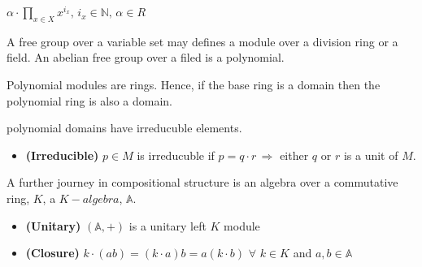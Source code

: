 \documentclass[aps,twocolumn,secnumarabic,nobalancelastpage,amsmath,amssymb,
amsthm,nofootinbib,parskip=full]{revtex4}
\begin{document}
\begin{center}
$\alpha\cdot\prod_{x\in X}x^{i_x},\,i_x\in\mathbb{N},\,\alpha\in R$
\end{center}

A free group over a variable set may defines a module over
a division ring or a field. An abelian free group over a filed
is a polynomial.

Polynomial modules are rings. Hence, if the base ring is a domain
then the polynomial ring is also a domain.

polynomial domains have irreducuble elements.

\begin{itemize}
\item \textbf{\small (Irreducible)} $p\in M$ is irreducuble
  if $p=q\cdot r\,\Rightarrow$ either $q$ or $r$ is a unit of $M$.
\end{itemize}

A further journey in compositional structure is an algebra over a
commutative ring, $K$, a $K-algebra$, $\mathbb{A}$.

\begin{itemize}
\item \textbf{\small (Unitary)} $(\mathbb{A},+)$ is a unitary left $K$ module
\item \textbf{\small (Closure)} $k\cdot(ab)=(k\cdot a)b=a(k\cdot b)$
  $\forall$ $k\in K$ and $a,b\in\mathbb{A}$
\end{itemize}


\end{document}
